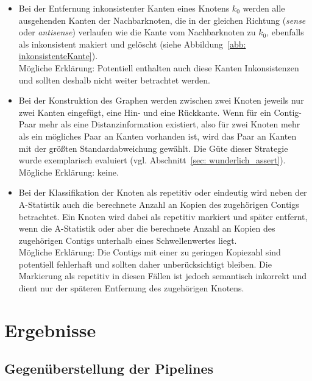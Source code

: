 \documentclass[a4paper,11pt,parskip]{scrartcl}
\begin{document}
\begin{itemize}
\item Bei der Entfernung inkonsistenter Kanten eines Knotens $k_0$
  werden alle ausgehenden Kanten der Nachbarknoten, die in der gleichen
  Richtung (\textit{sense} oder \textit{antisense}) verlaufen wie die
  Kante vom Nachbarknoten zu $k_0$, ebenfalls als inkonsistent makiert
  und gelöscht (siehe Abbildung~\ref{abb: inkonsistenteKante}).\\
  Mögliche Erklärung: Potentiell enthalten auch diese Kanten
  Inkonsistenzen und sollten deshalb nicht weiter betrachtet werden.
\item Bei der Konstruktion des Graphen werden zwischen zwei Knoten
  jeweils nur zwei Kanten eingefügt, eine Hin- und eine Rückkante.
  Wenn für ein Contig-Paar mehr als eine Distanzinformation existiert,
  also für zwei Knoten mehr als ein mögliches Paar an Kanten vorhanden ist,
  wird das Paar an Kanten mit der größten Standardabweichung gewählt.
  Die Güte dieser Strategie wurde exemplarisch evaluiert
  (vgl. Abschnitt~\ref{sec: wunderlich_assert}).\\
  Mögliche Erklärung: keine.
\item Bei der Klassifikation der Knoten als repetitiv oder eindeutig
  wird neben der A-Statistik auch die berechnete Anzahl an
  Kopien des zugehörigen Contigs betrachtet. Ein Knoten wird
  dabei als repetitiv markiert und später entfernt, wenn die
  A-Statistik oder aber die berechnete Anzahl an Kopien des zugehörigen
  Contigs unterhalb eines Schwellenwertes liegt. \\
  Mögliche Erklärung: Die Contigs mit einer zu geringen
  Kopiezahl sind potentiell fehlerhaft und sollten daher unberücksichtigt
  bleiben. Die Markierung als repetitiv in diesen Fällen ist jedoch
  semantisch inkorrekt und dient nur der späteren Entfernung des
  zugehörigen Knotens.
\end{itemize}

\section{Ergebnisse}
\label{sec: Ergebnisse}
\subsection{Gegenüberstellung der Pipelines}
\end{document}
